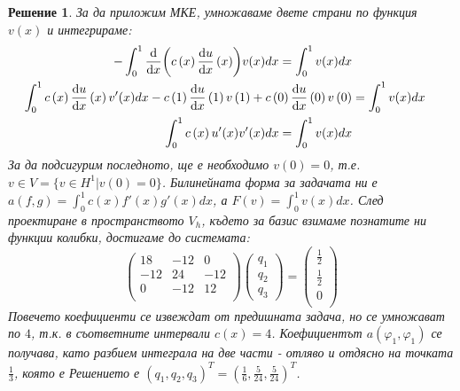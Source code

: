 \documentclass[12pt]{article}
\newtheorem*{solution*}{Решение}
\begin{document}
\begin{Large}
\begin{solution*}
За да приложим МКЕ, умножаваме двете страни по функция $v(x)$ и интегрираме:
\begin{align*}
-\int_{0}^{1}\dv{x}(c\left(x\right)\dv{u}{x}\left(x\right))v(x)dx = \int_{0}^{1}v(x)dx \\
\int_{0}^{1}c\left(x\right)\dv{u}{x}\left(x\right)v'(x)dx - c\left(1\right)\dv{u}{x}\left(1\right)v\left(1\right) + c\left(0\right)\dv{u}{x}\left(0\right)v\left(0\right) &= \int_{0}^{1}v(x)dx \\
\int_{0}^{1}c\left(x\right)u'(x)v'(x)dx = \int_{0}^{1}v(x)dx \\
\end{align*}
За да подсигурим последното, ще е необходимо $v\left(0\right)=0$, т.е. $v \in V = \{v \in H^1 \vert v\left(0\right)=0\}$. Билинейната форма за задачата ни е $a\left(f, g\right)=\int_{0}^{1}c(x)f'(x)g'(x)dx$, а $F\left(v\right)=\int_{0}^{1}v(x)dx$. След проектиране в пространството $V_h$, където за базис взимаме познатите ни функции колибки,  достигаме до системата: 
\begin{equation}
	\begin{pmatrix}
	18 & -12 & 0 \\
	-12 & 24 & -12 \\
	0 & -12 & 12 \\
	\end{pmatrix}
	\begin{pmatrix}
      q_1 \\
      q_2 \\
      q_3
    \end{pmatrix}
    =
    \begin{pmatrix}
      \frac{1}{2} \\
      \frac{1}{2} \\
      0 \\
    \end{pmatrix}
\end{equation}
Повечето коефициенти се извеждат от предишната задача, но се умножават по $4$, т.к. в съответните интервали $c(x)=4$. Коефициентът $a\left(\varphi_1, \varphi_1\right)$ се получава, като разбием интеграла на две части - отляво и отдясно на точката $\frac{1}{3}$, която е 
Решението е $(q_1, q_2, q_3)^T = (\frac{1}{6}, \frac{5}{24}, \frac{5}{24})^T$.
\end{solution*}
\end{Large}
\end{document}
